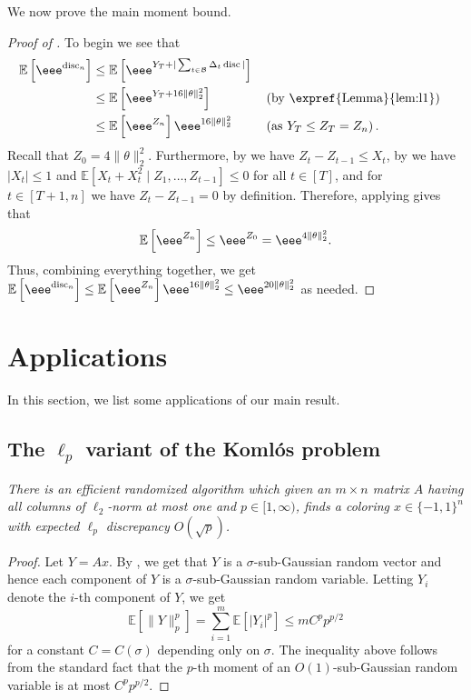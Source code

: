 \documentclass{toc}
\newcommand\E{\mathbb{E}}
\DeclareMathOperator{\disc}{disc}   %
\begin{document}
We now prove the main moment bound.

\begin{proof}[Proof of ]
To begin we see that
\begin{align*}
\E\left[\eee^{\disc_n}\right] &\leq \E\left[\eee^{Y_T + |\sum_{t \in \mathcal{B}} \Delta_t \disc|}\right] \\
          &\leq \E\left[\eee^{Y_T + 16\|\theta\|_2^2}\right] && \left(\text{by \expref{Lemma}{lem:l1}} \right) \\
          &\leq \E\left[\eee^{Z_n}\right] \eee^{16\|\theta\|_2^2} && \left(\text{as } Y_T \leq Z_T=Z_n\right).
\end{align*}
Recall that $Z_0 = 4\|\theta\|_2^2$. Furthermore, by  we have
$Z_t-Z_{t-1} \leq X_t$, by  we have $|X_t| \leq 1$ and
$\E\left[X_t+X_t^2\mid Z_1,\ldots,Z_{t-1}\right] \leq 0$ for all $t \in [T]$, and for $t\in[T+1,n]$ we have $Z_t-Z_{t-1}=0$ by definition. Therefore, applying
 gives that
\[
\E\left[\eee^{Z_n}\right] \leq \eee^{Z_0} = \eee^{4\|\theta\|_2^2}.
\]
Thus, combining everything together, we get
$
\E\left[\eee^{\disc_n}\right] \leq \E\left[\eee^{Z_n}\right] \eee^{16\|\theta\|_2^2} \leq \eee^{20\|\theta\|_2^2}$ as needed.
\end{proof}



\section{Applications}
\label{sec:applications}
In this section, we list some applications of our main result.

\subsection{The \texorpdfstring{$\ell_p$}{lp} variant of the Koml\'{o}s problem}

 \emph{There is an efficient randomized algorithm which
given an $m\times n$ matrix $A$ having all columns of $\ell_2$-norm at most one and $p\in [1,\infty)$, finds a coloring $x\in\{-1,1\}^n$ with expected $\ell_p$ discrepancy $O(\sqrt{p})$.
}

\begin{proof}
Let $Y=Ax$.
By , we get that $Y$ is a $\sigma$-sub-Gaussian random vector and hence each component of $Y$ is a $\sigma$-sub-Gaussian random variable. Letting $Y_i$ denote the $i$-th component of $Y$, we get
\[  \E[ \| Y\|_p^p] = \sum_{i=1}^m \E[|Y_i|^p] \le  mC^p p^{p/2}   \]
for a constant $C=C(\sigma)$ depending only on $\sigma$. The inequality above follows from the standard fact that the $p$-th moment of an $O(1)$-sub-Gaussian random variable is at most $C^pp^{p/2}$.
\end{proof}
\end{document}
